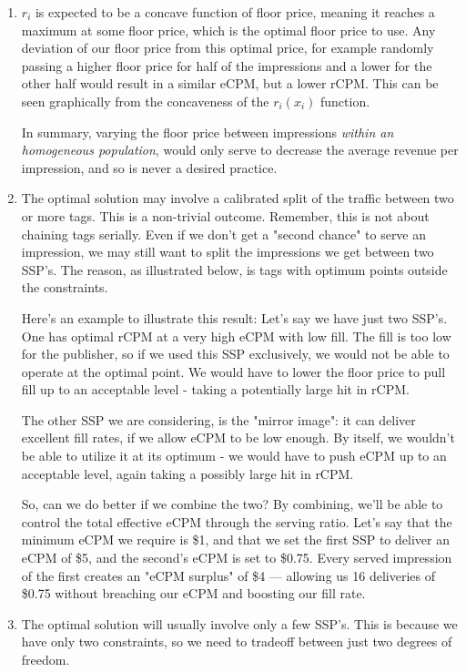 \documentclass{article}
\begin{document}
\begin{large}
\begin{enumerate}
\item $r_i$ is expected to be a concave function of floor price, meaning it reaches a maximum at some floor price, which is the optimal floor price to use. Any deviation of our floor price from this optimal price, for example randomly passing a higher floor price for half of the impressions and a lower for the other half would result in a similar eCPM, but a lower rCPM. This can be seen graphically from the concaveness of the $r_i(x_i)$ function. 

In summary, varying the floor price between impressions \emph{within an homogeneous population}, would only serve to decrease the average revenue per impression, and so is never a desired practice.

\item The optimal solution may involve a calibrated split of the traffic between two or more tags. This is a non-trivial outcome. Remember, this is not about chaining tags serially. Even if we don't get a "second chance" to serve an impression, we may still want to split the impressions we get between two SSP's. The reason, as illustrated below, is tags with optimum points outside the constraints. 

Here's an example to illustrate this result: Let's say we have just two SSP's. One has optimal rCPM at a very high eCPM with low fill. The fill is too low for the publisher, so if we used this SSP exclusively, we would not be able to operate at the optimal point. We would have to lower the floor price to pull fill up to an acceptable level - taking a potentially large hit in rCPM. 

The other SSP we are considering, is the "mirror image": it can deliver excellent fill rates, if we allow eCPM to be low enough. By itself, we wouldn't be able to utilize it at its optimum - we would have to push eCPM up to an acceptable level, again taking a possibly large hit in rCPM.

So, can we do better if we combine the two? By combining, we'll be able to control the total effective eCPM through the serving ratio. Let's say that the minimum eCPM we require is \$1, and that we set the first SSP to deliver an eCPM of \$5, and the second's eCPM is set to \$0.75. Every served impression of the first creates an "eCPM surplus" of \$4 --- allowing us 16 deliveries of \$0.75 without breaching our eCPM and boosting our fill rate.

\item The optimal solution will usually involve only a few SSP's. This is because we have only two constraints, so we need to tradeoff between just two degrees of freedom.
\end{enumerate}


\end{large}
\end{document}
